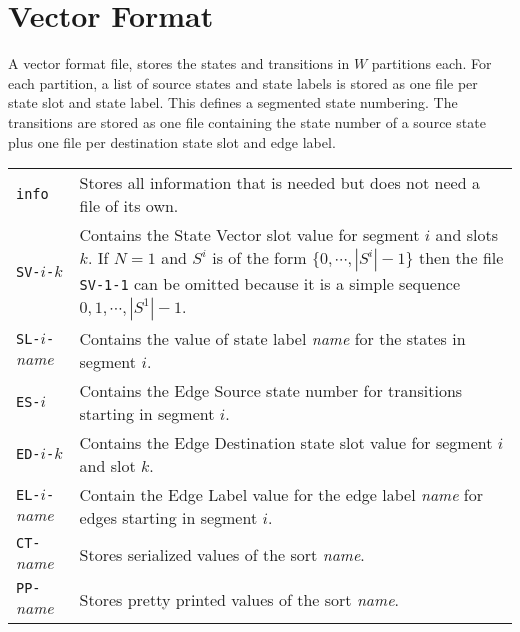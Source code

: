 \documentclass{report}
\theoremstyle{plain}
\begin{document}
\section{Vector Format}

A vector format file, stores the states and transitions
in $W$ partitions each. For each partition, a list of source states and state labels is stored
as one file per state slot and state label. This defines a segmented state numbering.
The transitions are stored as one file containing the state number of a source state
plus one file per destination state slot and edge label.

\par\noindent\begin{tabularx}{\textwidth}{lX}
\verb+info+ & Stores all information that is needed but does not need a file of its own.
\\
\verb+SV-+$i$\verb+-+$k$ & Contains the State Vector slot value for segment $i$ and slots $k$.
If $N = 1$ and $S^i$ is of the form $\{ 0 , \cdots , |S^i| -1 \}$ then the
file \verb+SV-1-1+ can be omitted because it is a simple sequence $0,1,\cdots,|S^1|-1$.
\\
\verb+SL-+$i$\verb+-+{\it name} & Contains the value of state label {\it name} for the states in
segment $i$.
\\
\verb+ES-+$i$ & Contains the Edge Source state number for transitions starting in segment $i$.
\\
\verb+ED-+$i$\verb+-+$k$ & Contains the Edge Destination state slot value for 
segment $i$ and slot $k$.
\\
\verb+EL-+$i$\verb+-+{\it name} &  Contain the Edge Label value for the edge label {\it name} for
edges starting in segment $i$.
\\
\verb+CT-+{\it name} & Stores serialized values of the sort {\it name}.
\\
\verb+PP-+{\it name} & Stores pretty printed values of the sort {\it name}.
\end{tabularx}
\end{document}
